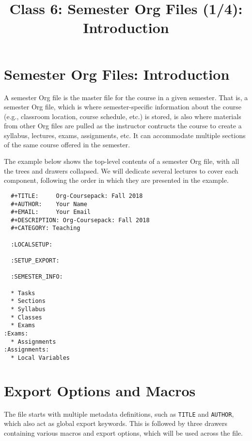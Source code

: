 \documentclass[10pt,article]{article}
\date{\vspace{-6ex}}
\title{Class 6: Semester Org Files (1/4): Introduction}
\begin{document}
\maketitle
{} 
\thispagestyle{fancy}

\setcounter{tocdepth}{1}
\tableofcontents
\vspace{6ex}

\section{Semester Org Files: Introduction}
\label{sec:org39bfec9}
A semester Org file is the master file for the course in a given
semester. That is, a semester Org file, which is where
semester-specific information about the course (e.g., classroom
location, course schedule, etc.) is stored, is also where materials
from other Org files are pulled as the instructor contructs the
course to create a syllabus, lectures, exams, assignments, etc. It can
accommodate multiple sections of the same course offered in the semester.

The example below shows the top-level contents of a semester Org file,
with all the trees and drawers collapsed. We will dedicate several
lectures to cover each component, following the order in which they are presented in the example.

\begin{verbatim}
  #+TITLE:     Org-Coursepack: Fall 2018
  #+AUTHOR:    Your Name
  #+EMAIL:     Your Email
  #+DESCRIPTION: Org-Coursepack: Fall 2018
  #+CATEGORY: Teaching
  
  :LOCALSETUP:
  
  :SETUP_EXPORT:
  
  :SEMESTER_INFO:
  
  * Tasks
  * Sections
  * Syllabus
  * Classes
  * Exams                                                               :Exams:
  * Assignments                                                   :Assignments:
  * Local Variables
\end{verbatim}
\section{Export Options and Macros}
\label{sec:org1341324}
The file starts with multiple metadata definitions, such as \texttt{TITLE}
and \texttt{AUTHOR}, which also act as global export keywords. This is
followed by three drawers containing various macros and export
options, which will be used across the file.
\end{document}
